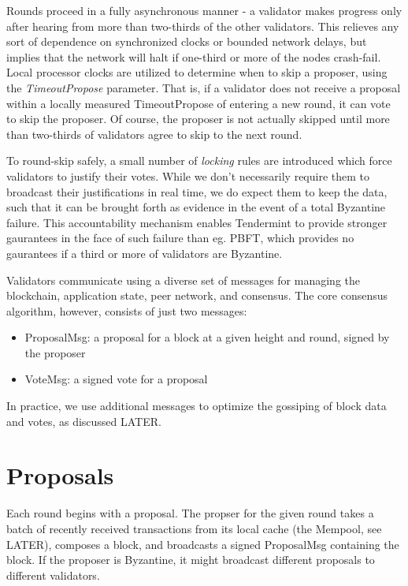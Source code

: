 Rounds proceed in a fully asynchronous manner - a validator makes progress only after hearing from more than two-thirds of the other validators.
This relieves any sort of dependence on synchronized clocks or bounded network delays,
but implies that the network will halt if one-third or more of the nodes crash-fail.
Local processor clocks are utilized to determine when to skip a proposer, using the \emph{TimeoutPropose} parameter.
That is, if a validator does not receive a proposal within a locally measured TimeoutPropose of entering a new round, it can vote to skip the proposer.
Of course, the proposer is not actually skipped until more than two-thirds of validators agree to skip to the next round.

To round-skip safely, a small number of \emph{locking} rules are introduced which force validators to justify their votes.
While we don't necessarily require them to broadcast their justifications in real time, we do expect them to keep the data,
such that it can be brought forth as evidence in the event of a total Byzantine failure.
This accountability mechanism enables Tendermint to provide stronger gaurantees in the face of such failure than eg. PBFT,
which provides no gaurantees if a third or more of validators are Byzantine.

Validators communicate using a diverse set of messages for managing the blockchain, application state, peer network, and consensus.
The core consensus algorithm, however, consists of just two messages:

\begin{itemize}
\item{ProposalMsg: a proposal for a block at a given height and round, signed by the proposer}
\item{VoteMsg: a signed vote for a proposal}
\end{itemize}

In practice, we use additional messages to optimize the gossiping of block data and votes, as discussed LATER.

\section{Proposals}

Each round begins with a proposal. 
The propser for the given round takes a batch of recently received transactions from its local cache (the Mempool, see LATER), 
composes a block, and broadcasts a signed ProposalMsg containing the block.
If the proposer is Byzantine, it might broadcast different proposals to different validators.


